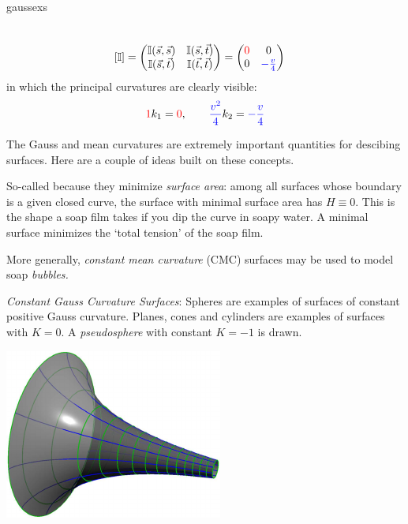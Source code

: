 \begin{examples}{}{gaussexs}
\begin{enumerate}
\begin{align*}
	  	\\
	  	&
	  	[\mathbb{I}]=
	  	\begin{pmatrix}
	  		\mathbb{I}(\vec s,\vec s)&\mathbb{I}(\vec s,\vec t)\\
	  		\mathbb{I}(\vec s,\vec t)&\mathbb{I}(\vec t,\vec t)
			\end{pmatrix}
			=
			\begin{pmatrix}
	  		\textcolor{red}{0}&0\\
	  		0&\textcolor{blue}{-\frac{v}4}
	  	\end{pmatrix}
	  \end{align*}
	  in which the principal curvatures are clearly visible:
	  \[
	  	\textcolor{red}{1}k_1=\textcolor{red}{0}, \qquad \textcolor{blue}{\frac{v^2}4}k_2 =\textcolor{blue}{-\frac{v}4}
	  \]
	\end{enumerate}
\end{examples}

\goodbreak

The Gauss and mean curvatures are extremely important quantities for descibing surfaces. Here are a couple of ideas built on these concepts.

\begin{description}
	\item[\normalfont\emph{Minimal Surfaces} $H\equiv 0$:] So-called because they minimize \emph{surface area}: among all surfaces whose boundary is a given closed curve, the surface with minimal surface area has $H\equiv 0$. This is the shape a soap film takes if you dip the curve in soapy water. A minimal surface minimizes the `total tension' of the soap film.
	
\begin{minipage}[t]{0.65\linewidth}\vspace{-9pt}
	More generally, \emph{constant mean curvature} (CMC) surfaces may be used to model soap \emph{bubbles.}
	\item[\normalfont\emph{Constant Gauss Curvature Surfaces}:] Spheres are examples of surfaces of constant positive Gauss curvature. Planes, cones and cylinders are examples of surfaces with $K=0$. A \emph{pseudosphere} with constant $K=-1$ is drawn.
\end{minipage}\hfill\begin{minipage}[t]{0.34\linewidth}\vspace{-20pt}
	\flushright\href{http://www.math.uci.edu/~ndonalds/math162a/curv-pseudosphere.html}{\includegraphics{curv-pseudosphere}}\vspace{-10pt}
\end{minipage}
\end{description}




